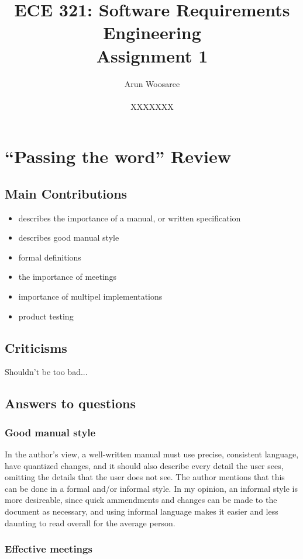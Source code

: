 \documentclass[letterpaper,12pt]{article}
\title{ECE 321: Software Requirements Engineering \\ Assignment 1}
\author{Arun Woosaree \\ \\ XXXXXXX}
\begin{document}
\maketitle

\section{``Passing the word'' Review}

\subsection{Main Contributions}
\begin{itemize}
 \item describes the importance of a manual, or written specification
 \item describes good manual style
 \item formal definitions
 \item the importance of meetings
 \item importance of multipel implementations
 \item product testing
\end{itemize}

\subsection{Criticisms}
Shouldn't be too bad...

\subsection{Answers to questions}
\subsubsection{Good manual style}

In the author's view, a well-written manual must use precise, consistent
language, have quantized changes, and  it should also describe every detail the
user sees, omitting the details that the user does not see. The author mentions
that this can be done in a formal and/or informal style. In my opinion, an
informal style is more desireable, since quick ammendments and changes can be made to
the document as necessary, and using informal language makes it easier and less
daunting to read overall for the average person.

\subsubsection{Effective meetings}
\end{document}
